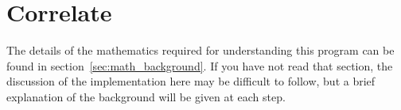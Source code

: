 \documentclass{article}
\newcommand{\angles}[1]{\ensuremath{\left\langle #1 \right\rangle}}
\newcommand{\gn}[1]{\ensuremath{g^{(#1)}}}
\begin{document}
\section{Correlate}
\label{sec:correlate}
The details of the mathematics required for understanding this program can be found in section~\ref{sec:math_background}. If you have not read that section, the discussion of the implementation here may be difficult to follow, but a brief explanation of the background will be given at each step.
\end{document}
